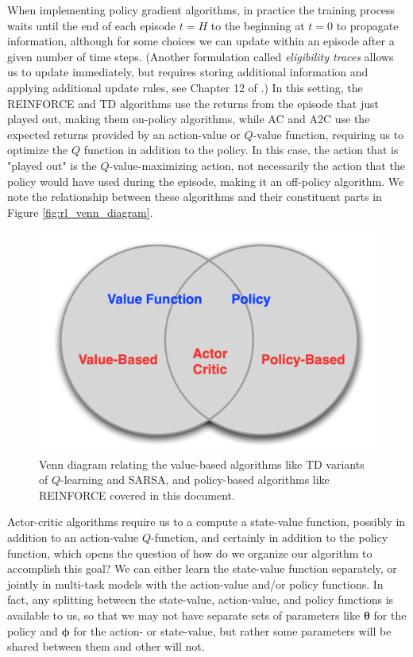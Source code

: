 \documentclass{article}
\begin{document}
When implementing policy gradient algorithms, in practice the training process waits until the end of each episode $t=H$ to the beginning at $t=0$ to propagate information, although for some choices we can update within an episode after a given number of time steps. (Another formulation called \textit{eligibility traces} allows us to update immediately, but requires storing additional information and applying additional update rules, see Chapter 12 of \cite{sutton_barto_rl}.) In this setting, the REINFORCE and TD algorithms use the returns from the episode that just played out, making them on-policy algorithms, while AC and A2C use the expected returns provided by an action-value or $Q$-value function, requiring us to optimize the $Q$ function in addition to the policy. In this case, the action that is "played out" is the $Q$-value-maximizing action, not necessarily the action that the policy would have used during the episode, making it an off-policy algorithm.  We note the relationship between these algorithms and their constituent parts in Figure \ref{fig:rl_venn_diagram}.

\begin{figure}
\label{fig:rl_venn_diagram}
    \begin{center}
    \includegraphics[width=0.75\linewidth]{rl_venn_diagram}
    \caption{Venn diagram relating the value-based algorithms like TD variants of $Q$-learning and SARSA, and policy-based algorithms like REINFORCE covered in this document. \footnotemark}
    \label{fig:basis_small_width}
    \end{center}
\end{figure}

Actor-critic algorithms require us to a compute a state-value function, possibly in addition to an action-value $Q$-function, and certainly in addition to the policy function, which opens the question of how do we organize our algorithm to accomplish this goal? We can either learn the state-value function separately, or jointly in multi-task models with the action-value and/or policy functions. In fact, any splitting between the state-value, action-value, and policy functions is available to us, so that we may not have separate sets of parameters like $\boldsymbol{\theta}$ for the policy and $\boldsymbol{\phi}$ for the action- or state-value, but rather some parameters will be shared between them and other will not. 
\end{document}
